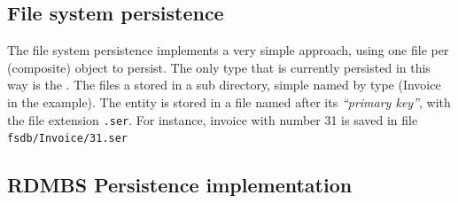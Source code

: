 \subsection{File system persistence}
The file system persistence implements a very simple approach, using one file
per (composite) object to persist. The only type that is currently persisted in
this way is the . The files a stored in a sub directory,
simple named by type (Invoice in the example). The entity is stored in
a file named after its \textit{``primary key''}, with the file extension 
\texttt{.ser}. For instance, invoice with  number 31 is saved in file \texttt{fsdb/Invoice/31.ser}
\subsection{RDMBS Persistence implementation}

